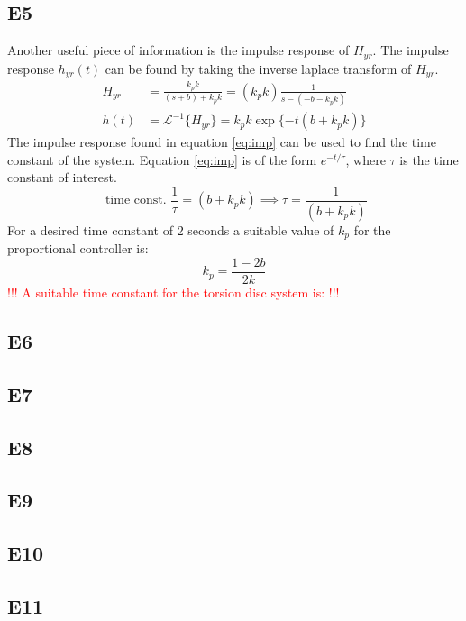 \documentclass[11pt,titlepage]{article}
\begin{document}
	\subsection*{E5}
		Another useful piece of information is the impulse response of $H_{yr}$. The impulse response $h_{yr}(t)$ can be found by taking the inverse laplace transform of $H_{yr}$.
		\begin{align}
			H_{yr}&=\frac{k_pk}{(s+b)+k_pk}=(k_pk)\frac{1}{s-(-b-k_pk)} \\
			h(t)&=\mathcal{L}^{-1}\{H_{yr}\} = k_pk\exp\{{-t(b+k_pk)}\} \label{eq:imp}
		\end{align} 		
		The impulse response found in equation \ref{eq:imp} can be used to find the time constant of the system. Equation \ref{eq:imp} is of the form $e^{-t/\tau}$, where $\tau$ is the time constant of interest. 
		\begin{equation} \label{eq:tconst}
			\mbox{ time const. }\frac{1}{\tau}=(b+k_pk)\implies \tau=\frac{1}{(b+k_pk)}
		\end{equation}
		For a desired time constant of 2 seconds a suitable value of $k_p$ for the proportional controller is:
		\begin{equation} \label{eq:2stau}
			k_p=\frac{1-2b}{2k}
		\end{equation}
		\textcolor{red}{!!! A suitable time constant for the torsion disc system is: !!!}

	\subsection*{E6}

	\subsection*{E7}

	\subsection*{E8}

	\subsection*{E9}

	\subsection*{E10}

	\subsection*{E11}
\end{document}
